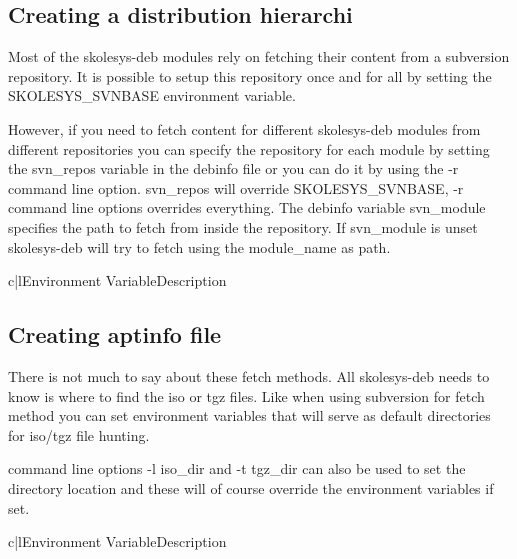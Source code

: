 \subsection{Creating a distribution hierarchi\label{skolesys-apt-pool}}
Most of the skolesys-deb modules rely on fetching their content from a subversion repository. It is possible to setup this repository once and for all by setting the SKOLESYS_SVNBASE environment variable. 

However, if you need to fetch content for different skolesys-deb modules from different repositories you can specify the repository for each module by setting the svn_repos variable in the debinfo file or you can do it by using the -r command line option. svn_repos will override SKOLESYS_SVNBASE, -r command line options overrides everything.
The debinfo variable svn_module specifies the path to fetch from inside the repository. If svn_module is unset skolesys-deb will try to fetch using the module_name as path.

\begin{tableii}{c|l}{}{Environment Variable}{Description}
\end{tableii}


\subsection{Creating aptinfo file\label{skolesys-apt-aptinfo}}
There is not much to say about these fetch methods. All skolesys-deb needs to know is where to find the iso or tgz files. Like when using subversion for fetch method you can set environment variables that will serve as default directories for iso/tgz file hunting.

command line options -l iso_dir and -t  tgz_dir can also be used to set the directory location and these will of course override the environment variables if set. 

\begin{tableii}{c|l}{}{Environment Variable}{Description}
\end{tableii}
